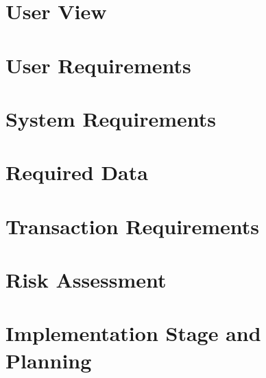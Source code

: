 \chapter{User View}


\chapter{User Requirements}


\chapter{System Requirements}


\chapter{Required Data}


\chapter{Transaction Requirements}


\chapter{Risk Assessment}


\chapter{Implementation Stage and Planning}

